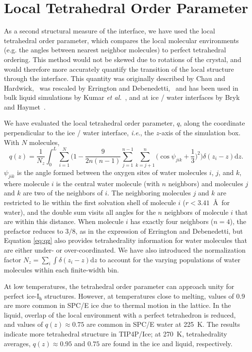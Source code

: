 \section{Local Tetrahedral Order Parameter}\label{sec:tetra}
As a second structural measure of the interface, we have used the
local tetrahedral order parameter, which compares the local molecular
environments (e.g. the angles between nearest neighbor molecules) to
perfect tetrahedral ordering. This method would not be skewed due to
rotations of the crystal, and would therefore more accurately quantify
the transition of the local structure through the interface. This
quantity was originally described by Chau and
Hardwick,~\cite{Chau1998} was rescaled by Errington and
Debenedetti,~\cite{Errington2001} and has been used in bulk liquid
simulations by Kumar \textit{et al.}~\cite{Kumar2009}, and at ice /
water interfaces by Bryk and Haymet~\cite{Bryk2004}.

We have evaluated the local tetrahedral order parameter, $q$, along
the coordinate perpendicular to the ice / water interface,
\textit{i.e}., the $z$-axis of the simulation box. With $N$ molecules,
\begin{equation}
q(z) = \frac{1}{N_z} \int_0^L \sum_{i=1}^{N} \Bigg(1 -\frac{9}{2n(n-1)}\sum_{j=1}^{n-1}
\sum_{k=j+1}^{n} \bigg(\cos\psi_{jik}+\frac{1}{3}\bigg)^2\Bigg)
\delta(z_{i}-z)\mathrm{d}z .
\label{eq:qz}
\end{equation}
$\psi_{jik}$ is the angle formed between the oxygen sites of water
molecules $i$, $j$, and $k$, where molecule $i$ is the central water
molecule (with $n$ neighbors) and molecules $j$ and $k$ are two of the
neighbors of $i$.  The neighboring molecules $j$ and $k$ are
restricted to lie within the first solvation shell of molecule $i$
($r < 3.41$~\AA\ for water), and the double sum visits all angles for
the $n$ neighbors of molecule $i$ that are within this distance.  When
molecule $i$ has exactly four neighbors ($n=4$), the prefactor reduces
to $3/8$, as in the expression of Errington and Debenedetti, but
Equation \eqref{eq:qz} also provides tetrahedrality information for water
molecules that are either under- or over-coordinated. We have also
introduced the normalization factor
$N_z = \sum_i \int \delta(z_i - z) \mathrm{d}z$ to account for the
varying populations of water molecules within each finite-width bin.

At low temperatures, the tetrahedral order parameter can approach
unity for perfect ice-I$_\mathrm{h}$ structures. However, at
temperatures close to melting, values of 0.9 are more common in SPC/E
ice due to thermal motion in the lattice. In the liquid, overlap of
the local environment with a perfect tetrahedron is reduced, and
values of $q(z) \approx 0.75$ are common in SPC/E water at 225~K. The
results indicate more tetrahedral structure in TIP4P/Ice; at
270~K, tetrahedrality averages, $q(z) \approx 0.95$ and $0.75$ are
found in the ice and liquid, respectively.


